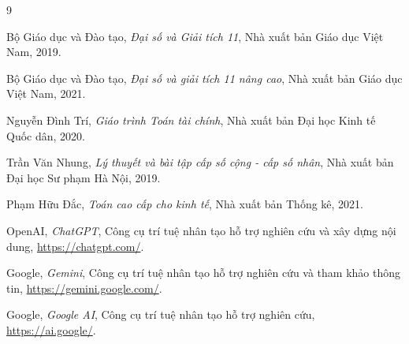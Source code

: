 \documentclass[12pt,a4paper]{report}
\begin{document}
\begin{thebibliography}{9}

Bộ Giáo dục và Đào tạo,
\textit{Đại số và Giải tích 11},
Nhà xuất bản Giáo dục Việt Nam, 2019.

Bộ Giáo dục và Đào tạo,
\textit{Đại số và giải tích 11 nâng cao},
Nhà xuất bản Giáo dục Việt Nam, 2021.

Nguyễn Đình Trí,
\textit{Giáo trình Toán tài chính},
Nhà xuất bản Đại học Kinh tế Quốc dân, 2020.

Trần Văn Nhung,
\textit{Lý thuyết và bài tập cấp số cộng - cấp số nhân},
Nhà xuất bản Đại học Sư phạm Hà Nội, 2019.

Phạm Hữu Đắc,
\textit{Toán cao cấp cho kinh tế},
Nhà xuất bản Thống kê, 2021.

OpenAI,
\textit{ChatGPT},
Công cụ trí tuệ nhân tạo hỗ trợ nghiên cứu và xây dựng nội dung,
\url{https://chatgpt.com/}.

Google,
\textit{Gemini},
Công cụ trí tuệ nhân tạo hỗ trợ nghiên cứu và tham khảo thông tin,
\url{https://gemini.google.com/}.

Google,
\textit{Google AI},
Công cụ trí tuệ nhân tạo hỗ trợ nghiên cứu,
\url{https://ai.google/}.

\end{thebibliography}
\end{document}
